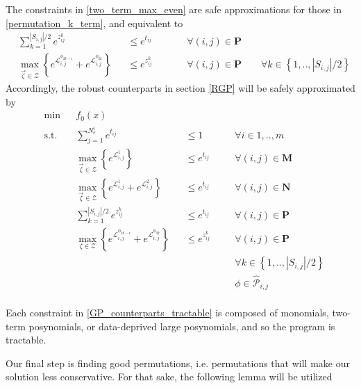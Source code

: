 The constraints in \eqref{two_term_max_even} are safe approximations for those in \eqref{permutation_k_term}, and equivalent to
\begin{equation}
\begin{aligned}
&\textstyle{\sum}_{k=1}^{|S_{i,j}|/2} e^{z_{ij}^k} &&\leq e^{t_{ij}} \qquad &&\forall (i, j) \in \mathbf{P}\\
&\max_{\vec{\zeta} \in \mathcal{Z}} \left\{e^{\mathcal{L}^{\phi_{2k-1}}_{i,j}} + e^{\mathcal{L}^{\phi_{2k}}_{i,j}}\right\} &&\leq e^{z_{ij}^k} &&\forall (i, j) \in \mathbf{P} \qquad \forall k \in \left\{1,..,|S_{i,j}|/2\right\}
\end{aligned}
\label{two_term_even}
\end{equation}
Accordingly, the robust counterparts in section \ref{RGP} will be safely approximated by
\begin{equation}
\begin{aligned}
&\min &&f_0(x)\\
&\text{s.t.} &&\textstyle{\sum}_{j=1}^{N_e^i} e^{t_{ij}} &&\leq 1 \quad &&\forall i \in 1,..,m\\
& &&\max_{\vec{\zeta} \in \mathcal{Z}} \left\{e^{\mathcal{L}_{i,j}^1} \right\} &&\leq e^{t_{ij}} &&\forall (i,j) \in \mathbf{M}\\
& &&\max_{\vec{\zeta} \in \mathcal{Z}} \left\{e^{\mathcal{L}_{i,j}^1} + e^{\mathcal{L}_{i,j}^2} \right\} &&\leq e^{t_{ij}} &&\forall (i,j) \in \mathbf{N}\\
& &&\textstyle{\sum}_{k=1}^{|S_{i,j}|/2} e^{z_{ij}^k} &&\leq e^{t_{ij}} \quad &&\forall (i,j) \in \mathbf{P}\\
& &&\max_{\zeta \in \mathcal{Z}} \left\{e^{\mathcal{L}^{\phi_{2k-1}}_{i,j}} + e^{\mathcal{L}^{\phi_{2k}}_{i,j}}\right\} &&\leq e^{z_{ij}^k} &&\forall (i,j) \in \mathbf{P}\\
& && && &&\forall k \in \left\{1,..,|S_{i,j}|/2\right\}\\
& && && && \phi \in \hat{\mathcal{P}}_{i,j}\\
\end{aligned}
\label{GP_counterparts_tractable}
\end{equation}

Each constraint in \eqref{GP_counterparts_tractable} is composed of monomials, two-term posynomials, or data-deprived large posynomials, and so the program is tractable.

Our final step is finding good permutations, i.e. permutations that will make our solution less conservative. For that sake, the following lemma will be utilized

